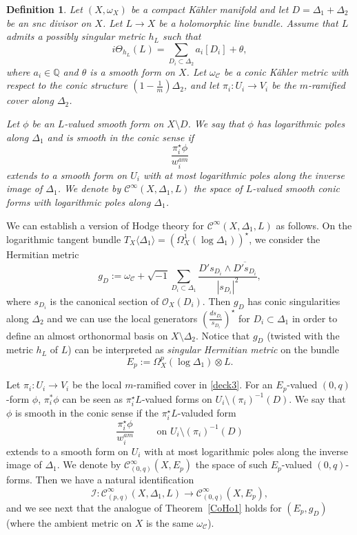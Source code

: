 \documentclass[english]{amsart}
\newcommand{\cC}{\mathcal{C}}
\newcommand{\ol}{\overline}
\newtheorem{defn}[thm]{Definition}
\numberwithin{equation}{thm}
\begin{document}
\begin{defn}\label{logconic}
	Let $(X,\omega_X)$ be a compact K\"ahler manifold and let $D=\Delta_1+\Delta_2$ be an snc divisor on $X$.
	Let $L\to X$ be a holomorphic line bundle. Assume that $L$ admits a possibly singular metric $h_L$ such that
	\[
	i\Theta_{h_L}(L)=\sum_{D_i\subset \Delta_2} a_i [D_i]+\theta,
	\]
	where $a_i\in \mathbb Q$ and $\theta$ is a smooth form on $X$.
	Let $\omega_{\cC}$ be a conic K\"ahler metric with respect to the conic structure $(1-\frac{1}{m})\Delta_2$, and let $\pi_i:U_i\to V_i$ be the $m$-ramified cover along $\Delta_2$.
	
	Let $\phi$ be an $L$-valued smooth form on $X\setminus D$. We say that $\phi$ has \emph{logarithmic poles along $\Delta_1$ and is smooth in the conic sense} if
	\[
	\frac{\pi_i^\star \phi}{w_i^{am}}
	\]
	extends to a smooth form on $U_i$ with at most logarithmic poles along the inverse image of $\Delta_1$.
	We denote by $\cC^\infty(X,\Delta_1,L)$ the space of $L$-valued smooth conic forms with logarithmic poles along $\Delta_1$.
\end{defn}

We can establish a version of Hodge theory for $\cC^\infty(X,\Delta_1,L)$ as follows.
On the logarithmic tangent bundle $T_X\langle \Delta_1\rangle = (\Omega^1 _X ( \log \Delta_1))^\star$, we consider the Hermitian metric
\begin{equation}\label{log2}
	g_D:= \omega_{\cC} + \sqrt{-1}\sum_{D_i\subset \Delta_1}
	\frac{D's_{D_i}\wedge \ol{D's_{D_i}}}{|s_{D_i}|^2} ,
\end{equation}
where $s_{D_i}$ is the canonical section of $\mathcal{O}_X (D_i)$.
Then $g_D$ has conic singularities along $\Delta_2$ and we can use the local generators $(\frac{ds_{D_i}}{s_{D_i}})^\star$ for $D_i\subset \Delta_1$ in order to define an almost orthonormal basis on $X\setminus \Delta_2$.
Notice that $g_D$ (twisted with the metric $h_L$ of $L$) can be interpreted as \emph{singular Hermitian metric} on the bundle
\[
E_p:=\Omega_X^p(\log \Delta_1)\otimes L.
\]

Let $\pi_i: U_i \to V_i$ be the local $m$-ramified cover in \eqref{deck3}. 
For an $E_p$-valued $(0,q)$-form $\phi$,  $\pi_i ^* \phi$ can be seen as $\pi^\star _i L$-valued forms on $U_i \setminus (\pi_i)^{-1} (D)$. 
We say that $\phi$ is smooth in the conic sense if the $\pi^\star _i L$-valuded form
\[
\frac{\pi_i^\star \phi}{w_i^{am}} \qquad\text{ on } U_i \setminus (\pi_i)^{-1} (D)
\]
extends to a smooth form on $U_i$ with at most logarithmic poles along the inverse image of $\Delta_1$.
We denote by $\cC^\infty_{(0,q)}(X,E_p)$ the space of such $E_p$-valued $(0,q)$-forms.
Then we have a natural identification
\begin{equation}\label{identifi}
	\mathcal{I}:\cC^\infty_{(p,q)}(X,\Delta_1,L)\longrightarrow \cC^\infty_{(0,q)}(X,E_p),
\end{equation}
and we see next that the analogue of Theorem~\ref{CoHo1} holds for $(E_p,g_D)$ (where the ambient metric on $X$ is the same $\omega_{\cC}$).
\end{document}
